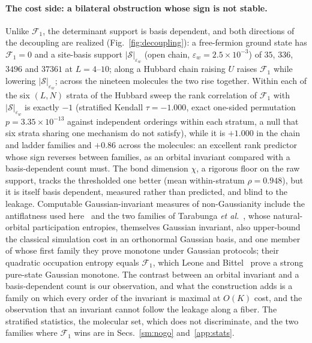 \paragraph{The cost side: a bilateral obstruction whose sign is not stable.} Unlike $\mathcal F_1$, the
determinant support is basis dependent, and both directions of the decoupling are realized
(Fig.~\ref{fig:decoupling}): a free-fermion ground state has $\mathcal F_1=0$ and a site-basis support
$|\mathcal S|_{\varepsilon_w}$ (open chain, $\varepsilon_w=2.5\times10^{-3}$) of $35$, $336$, $3496$ and
$37361$ at $L=4$--$10$; along a Hubbard chain raising $U$ raises
$\mathcal F_1$ while lowering $|\mathcal S|_{\varepsilon_w}$; across the nineteen molecules the two rise
together. Within each of the six $(L,N)$ strata of the Hubbard sweep the rank correlation of
$\mathcal F_1$ with $|\mathcal S|_{\varepsilon_w}$ is exactly $-1$ (stratified Kendall $\tau=-1.000$,
exact one-sided permutation $p=3.35\times10^{-13}$ against independent orderings within each stratum,
a null that six strata sharing one mechanism do not satisfy), while it is $+1.000$ in the chain and
ladder families and $+0.86$ across the molecules: an excellent rank predictor whose sign reverses
between families, as an orbital invariant compared with a basis-dependent count must. The bond
dimension $\chi$, a rigorous floor on the raw support, tracks the thresholded one better (mean
within-stratum $\rho=0.948$), but it is itself basis dependent, measured rather than predicted, and
blind to the leakage. Computable Gaussian-invariant measures of non-Gaussianity include the
antiflatness used here~\cite{sierant2026} and the two families of Tarabunga \emph{et al.}~\cite{tarabunga2026},
whose natural-orbital participation entropies, themselves Gaussian invariant, also upper-bound the
classical simulation cost in an orthonormal Gaussian basis, and one member of whose first family they
prove monotone under Gaussian protocols; their quadratic occupation entropy equals $\mathcal F_1$,
which Leone and Bittel~\cite{leonebittel2026} prove a strong pure-state Gaussian monotone. The contrast
between an orbital invariant and a basis-dependent count is our observation, and what the
construction adds is a family on which every order of the invariant is maximal at $O(K)$ cost, and
the observation that an invariant cannot follow the leakage along a fiber. The stratified statistics, the molecular set, which does not discriminate, and the two
families where $\mathcal F_1$ wins are in Secs.~\ref{sm:nogo} and~\ref{app:stats}.

